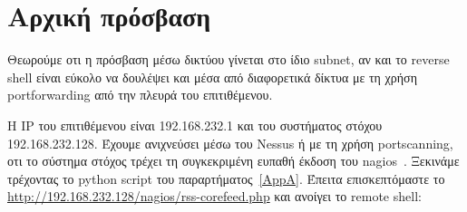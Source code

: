 \documentclass[12pt]{report}
\begin{document}
\section{Αρχική πρόσβαση}
Θεωρούμε οτι η πρόσβαση μέσω δικτύου γίνεται στο ίδιο \textlatin{subnet}, αν και το \textlatin{reverse shell}
είναι εύκολο να δουλέψει και μέσα από διαφορετικά δίκτυα με τη χρήση \textlatin{portforwarding} από την πλευρά του επιτιθέμενου.

Η \textlatin{IP} του επιτιθέμενου είναι 192.168.232.1 και του συστήματος στόχου 192.168.232.128. Έχουμε ανιχνεύσει μέσω του \textlatin{Nessus} ή με τη χρήση \textlatin{portscanning}, οτι το σύστημα στόχος τρέχει τη συγκεκριμένη ευπαθή έκδοση του \textlatin{nagios}~\cite{exploit:01}. Ξεκινάμε τρέχοντας το \textlatin{python script} του παραρτήματος~\ref{AppA}. Έπειτα επισκεπτόμαστε το \textlatin{\url{http://192.168.232.128/nagios/rss-corefeed.php}} και ανοίγει το \textlatin{remote shell}:
\end{document}
